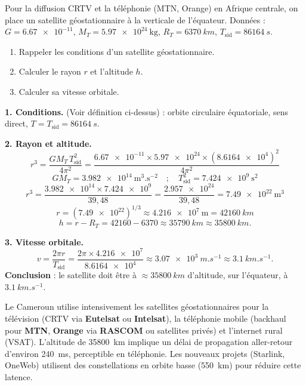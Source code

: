 \documentclass[11pt]{article}
\begin{document}
\begin{exoresolu}
Pour la diffusion CRTV et la téléphonie (MTN, Orange) en Afrique centrale, on place un satellite géostationnaire à la verticale de l'équateur. Données : $G = \num{6,67e-11}$, $M_T = \num{5,97e24}\ \mathrm{kg}$, $R_T = \SI{6370}{km}$, $T_{\text{sid}} = \SI{86164}{s}$.
\begin{enumerate}
\item Rappeler les conditions d'un satellite géostationnaire.
\item Calculer le rayon $r$ et l'altitude $h$.
\item Calculer sa vitesse orbitale.
\end{enumerate}
\tcblower
\textbf{1. Conditions.} (Voir définition ci-dessus) : orbite circulaire équatoriale, sens direct, $T = T_{\text{sid}} = \SI{86164}{s}$.

\textbf{2. Rayon et altitude.}
\[ r^3 = \frac{GM_T\,T_{\text{sid}}^2}{4\pi^2} = \frac{\num{6,67e-11} \times \num{5,97e24} \times (\num{8,6164e4})^2}{4\pi^2} \]
\[ GM_T = \num{3,982e14}\ \mathrm{m^3.s^{-2}} \quad ; \quad T_{\text{sid}}^2 = \num{7,424e9}\ \mathrm{s^2} \]
\[ r^3 = \frac{\num{3,982e14} \times \num{7,424e9}}{39,48} = \frac{\num{2,957e24}}{39,48} = \num{7,49e22}\ \mathrm{m^3} \]
\[ r = (\num{7,49e22})^{1/3} \approx \num{4,216e7}\ \mathrm{m} = \SI{42160}{km} \]
\[ h = r - R_T = 42160 - 6370 \approx \SI{35790}{km} \approx \SI{35800}{km}. \]

\textbf{3. Vitesse orbitale.}
\[ v = \frac{2\pi r}{T_{\text{sid}}} = \frac{2\pi \times \num{4,216e7}}{\num{8,6164e4}} \approx \SI{3,07e3}{m.s^{-1}} \approx \SI{3,1}{km.s^{-1}}. \]
\textbf{Conclusion} : le satellite doit être à $\approx \SI{35800}{km}$ d'altitude, sur l'équateur, à $\SI{3,1}{km.s^{-1}}$.
\end{exoresolu}

\begin{savaistu}
Le Cameroun utilise intensivement les satellites géostationnaires pour la télévision (CRTV via \textbf{Eutelsat} ou \textbf{Intelsat}), la téléphonie mobile (backhaul pour \textbf{MTN}, \textbf{Orange} via \textbf{RASCOM} ou satellites privés) et l'internet rural (VSAT). L'altitude de \SI{35800}{km} implique un délai de propagation aller-retour d'environ \SI{240}{ms}, perceptible en téléphonie. Les nouveaux projets (Starlink, OneWeb) utilisent des constellations en orbite basse (\SI{550}{km}) pour réduire cette latence.
\end{savaistu}
\end{document}
